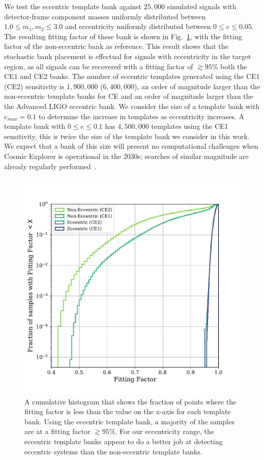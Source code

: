 We test the eccentric template bank against $25,000$ simulated signals with detector-frame component masses uniformly distributed between $1.0 \leq m_1,m_2 \leq 3.0$ and eccentricity uniformly distributed between $0 \le e \le 0.05$. The resulting fitting factor of these bank is shown in Fig.~\ref{Fig:cumul-hist}, with the fitting factor of the non-eccentric bank as reference. This result shows that the stochastic bank placement is effectual for signals with eccentricity in the target region, as all signals can be recovered with a fitting factor of $\gtrsim 95\%$ both the CE1 and CE2 banks. The number of eccentric templates generated using the CE1 (CE2) sensitivity is $1,900,000$ ($6,400,000$), an order of magnitude larger than the non-eccentric template banks for CE and an order of magnitude larger than the the Advanced LIGO eccentric bank. We consider the size of a template bank with $e_{max} = 0.1$ to determine the increase in templates as eccentricity increases. A template bank with $0 \le e \le 0.1$ has $4,500,000$ templates using the CE1 sensitivity, this is twice the size of the template bank we consider in this work. We expect that a bank of this size will present no computational challenges when Cosmic Explorer is operational in the 2030s; searches of similar magnitude are already regularly performed~\cite{Nitz:2020bdb, Nitz:2021mzz}.  

\begin{figure}
    \includegraphics[width=1.1\columnwidth]{Figures/3G-bns-search-prospects/cumhist-ff-CB.pdf}
    \caption{A cumulative histogram that shows the fraction of points where the fitting factor is less than the value on the x-axis for each template bank. Using the eccentric template bank, a majority of the samples are at a fitting factor $\gtrsim 95\%$. For our eccentricity range, the eccentric template banks appear to do a better job at detecting eccentric systems than the non-eccentric template banks.}
\label{Fig:cumul-hist}
\end{figure}
        
